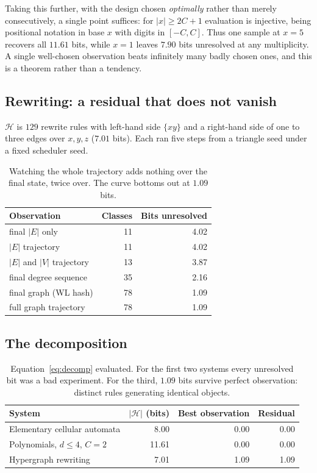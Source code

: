 \documentclass[11pt]{article}
\newcommand{\HH}{\ensuremath{\mathcal{H}}}
\begin{document}
Taking this further, with the design chosen \emph{optimally} rather than merely
consecutively, a single point suffices: for $|x| \ge 2C+1$ evaluation is injective,
being positional notation in base $x$ with digits in $[-C,C]$. Thus one sample at
$x=5$ recovers all $11.61$ bits, while $x=1$ leaves $7.90$ bits unresolved at any
multiplicity. A single well-chosen observation beats infinitely many badly chosen ones,
and this is a theorem rather than a tendency.

\subsection{Rewriting: a residual that does not vanish}

$\HH$ is $129$ rewrite rules with left-hand side $\{xy\}$ and a right-hand side of one
to three edges over $x,y,z$ ($7.01$ bits). Each ran five steps from a triangle seed
under a fixed scheduler seed.

\begin{table}[h]
\centering
\begin{tabular}{lrr}
\toprule
Observation & Classes & Bits unresolved \\
\midrule
final $|E|$ only & 11 & 4.02 \\
$|E|$ trajectory & 11 & 4.02 \\
$|E|$ and $|V|$ trajectory & 13 & 3.87 \\
final degree sequence & 35 & 2.16 \\
final graph (WL hash) & 78 & 1.09 \\
full graph trajectory & 78 & 1.09 \\
\bottomrule
\end{tabular}
\caption{Watching the whole trajectory adds nothing over the final state, twice over.
The curve bottoms out at $1.09$ bits.}
\end{table}

\subsection{The decomposition}

\begin{table}[h]
\centering
\begin{tabular}{lrrr}
\toprule
System & $|\HH|$ (bits) & Best observation & Residual \\
\midrule
Elementary cellular automata & 8.00 & 0.00 & 0.00 \\
Polynomials, $d\le4$, $C=2$ & 11.61 & 0.00 & 0.00 \\
Hypergraph rewriting & 7.01 & 1.09 & 1.09 \\
\bottomrule
\end{tabular}
\caption{Equation~\eqref{eq:decomp} evaluated. For the first two systems every
unresolved bit was a bad experiment. For the third, $1.09$ bits survive perfect
observation: distinct rules generating identical objects.}
\end{table}
\end{document}

